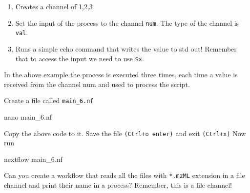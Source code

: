 \documentclass[
]{book}
\newenvironment{Shaded}{\begin{snugshade}}{\end{snugshade}}
\newcommand{\BuiltInTok}[1]{#1}
\newcommand{\ErrorTok}[1]{\textcolor[rgb]{0.64,0.00,0.00}{\textbf{#1}}}
\newcommand{\ExtensionTok}[1]{#1}
\newcommand{\FunctionTok}[1]{\textcolor[rgb]{0.00,0.00,0.00}{#1}}
\newcommand{\KeywordTok}[1]{\textcolor[rgb]{0.13,0.29,0.53}{\textbf{#1}}}
\newcommand{\NormalTok}[1]{#1}
\newcommand{\StringTok}[1]{\textcolor[rgb]{0.31,0.60,0.02}{#1}}
\newcommand{\VariableTok}[1]{\textcolor[rgb]{0.00,0.00,0.00}{#1}}
\providecommand{\tightlist}{%
  \setlength{\itemsep}{0pt}\setlength{\parskip}{0pt}}
\begin{document}
\begin{enumerate}
\def\labelenumi{\arabic{enumi}.}
\tightlist
\item
  Creates a channel of 1,2,3
\item
  Set the input of the process to the channel \texttt{num}. The type of the channel is \texttt{val}.
\item
  Runs a simple echo command that writes the value to std out! Remember that to access the input we need to use \texttt{\$x}.
\end{enumerate}

In the above example the process is executed three times, each time a value is received from the channel num and used to process the script.

Create a file called \texttt{main\_6.nf}

\begin{Shaded}
\begin{Highlighting}[numbers=left,,]
\FunctionTok{nano}\NormalTok{ main\_6.nf}
\end{Highlighting}
\end{Shaded}

Copy the above code to it. Save the file \texttt{(Ctrl+o\ enter)} and exit \texttt{(Ctrl+x)}
Now run

\begin{Shaded}
\begin{Highlighting}[numbers=left,,]
\ExtensionTok{nextflow}\NormalTok{ main\_6.nf}
\end{Highlighting}
\end{Shaded}

Can you create a workflow that reads all the files with \texttt{*.mzML} extension in a file channel and print their name in a process? Remember, this is a file channel!

\begin{Shaded}
\end{Shaded}
\end{document}
